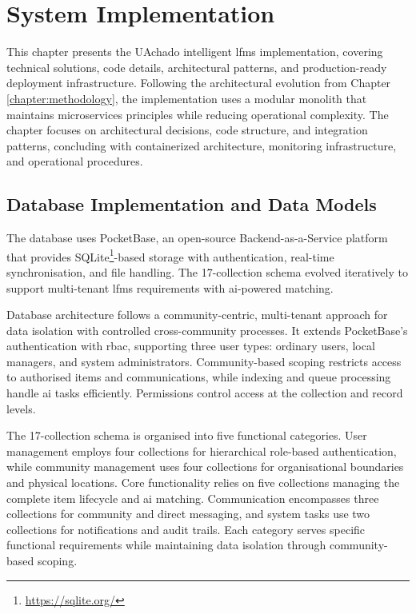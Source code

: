 \chapter{System Implementation} \label{chapter:implementation}

This chapter presents the UAchado intelligent \ac{lfms} implementation, covering technical solutions, code details, architectural patterns, and production-ready deployment infrastructure. Following the architectural evolution from Chapter \ref{chapter:methodology}, the implementation uses a modular monolith that maintains microservices principles while reducing operational complexity. The chapter focuses on architectural decisions, code structure, and integration patterns, concluding with containerized architecture, monitoring infrastructure, and operational procedures.


\section{Database Implementation and Data Models} \label{section:database_implementation}

The database uses PocketBase, an open-source Backend-as-a-Service platform that provides SQLite\footnote{\url{https://sqlite.org/}}-based storage with authentication, real-time synchronisation, and file handling. The 17-collection schema evolved iteratively to support multi-tenant \ac{lfms} requirements with \ac{ai}-powered matching.

Database architecture follows a community-centric, multi-tenant approach for data isolation with controlled cross-community processes. It extends PocketBase's authentication with \ac{rbac}, supporting three user types: ordinary users, local managers, and system administrators. Community-based scoping restricts access to authorised items and communications, while indexing and queue processing handle \ac{ai} tasks efficiently. Permissions control access at the collection and record levels.

The 17-collection schema is organised into five functional categories. User management employs four collections for hierarchical role-based authentication, while community management uses four collections for organisational boundaries and physical locations. Core functionality relies on five collections managing the complete item lifecycle and \ac{ai} matching. Communication encompasses three collections for community and direct messaging, and system tasks use two collections for notifications and audit trails. Each category serves specific functional requirements while maintaining data isolation through community-based scoping.

